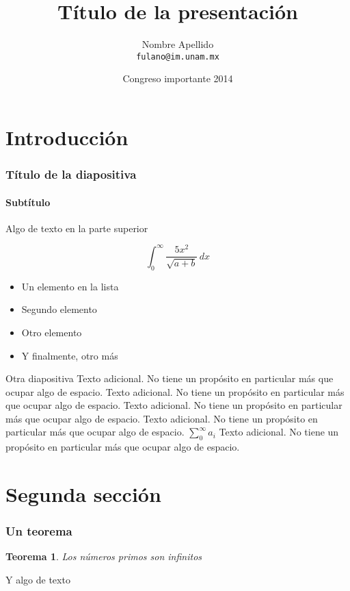 \documentclass{beamer}
\title{Título de la presentación}
\author{Nombre Apellido \\ %
	      \texttt{fulano@im.unam.mx}} %
\date{Congreso importante 2014} %
\newtheorem{teorema}{Teorema}
\begin{document}
\begin{frame}

  \titlepage %
  
\end{frame}

\begin{frame}
\tableofcontents %
\end{frame}

\section{Introducción} %
\begin{frame}
  \frametitle{Título de la diapositiva}
  \framesubtitle{Subtítulo} %
  Algo de texto en la parte superior
  
  \[
   \int_{0}^{\infty} \frac{5x^2}{\sqrt{a+b}}\, dx
   \]

  \begin{itemize}
    \item[\checkmark] Un elemento en la lista %
    \item Segundo elemento
    \item Otro elemento
    \item Y finalmente, otro más
  \end{itemize}
\end{frame}

\begin{frame}{Otra diapositiva} %
Texto adicional. No tiene un propósito en particular más que ocupar algo de espacio.
Texto adicional. No tiene un propósito en particular más que ocupar algo de espacio.
Texto adicional. No tiene un propósito en particular más que ocupar algo de espacio.
Texto adicional. No tiene un propósito en particular más que ocupar algo de espacio.
\( \sum_0^{\infty} a_i \) 
Texto adicional. No tiene un propósito en particular más que ocupar algo de espacio.
\end{frame}

\section{Segunda sección} %
\begin{frame}
    \frametitle{Un teorema}
    
    \begin{teorema} %
        Los números primos son infinitos
    \end{teorema}

    Y algo de texto
\end{frame}
\end{document}
